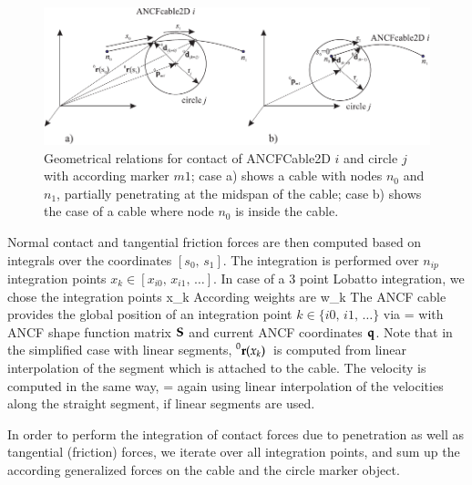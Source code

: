 \begin{figure}[tbph]
  \begin{center}
  \includegraphics[width=\textwidth]{figures/generalContactANCF2Dcircle}
  \end{center}
  \caption{Geometrical relations for contact of ANCFCable2D $i$ and circle $j$ with according marker $m1$; case a) shows a cable with nodes $n_0$ and $n_1$, partially penetrating at the midspan of the cable; case b) shows the case of a cable where node $n_0$ is inside the cable.}
  \label{fig_generalContactANCF2Dcircle}
\end{figure}

Normal contact and tangential friction forces are then computed based on integrals over the coordinates $[s_0,\, s_1]$.
The integration is performed over $n_{ip}$ integration points $x_k \in [x_{i0},\, x_{i1},\, \ldots]$. In case of a 3 point Lobatto integration, we chose the integration points 
\be
  x_k \in [s_0, (s_0+s_1)/2, s_1] \eqDot
\ee
According weights are
\be
  w_k \in [1/3, 4/3, 1/3] \eqDot
\ee
The ANCF cable provides the global position of an integration point $k \in \{i0,\, i1,\, \ldots\}$ via
\be
   =  \qv
\ee
with ANCF shape function matrix $\mathbf{S}$ and current ANCF coordinates $\mathbf{q}$.
Note that in the simplified case with linear segments, $\prescript{0}{}{\mathbf{r}(x_{k})}\,$ is computed from linear interpolation of the segment which is attached to the cable.
The velocity is computed in the same way,
\be
   =  \dot\qv
\ee
again using linear interpolation of the velocities along the straight segment, if linear segments are used.

In order to perform the integration of contact forces due to penetration as well as tangential (friction) forces, we iterate over all integration points, and sum up the according generalized forces on the cable and the circle marker object.

